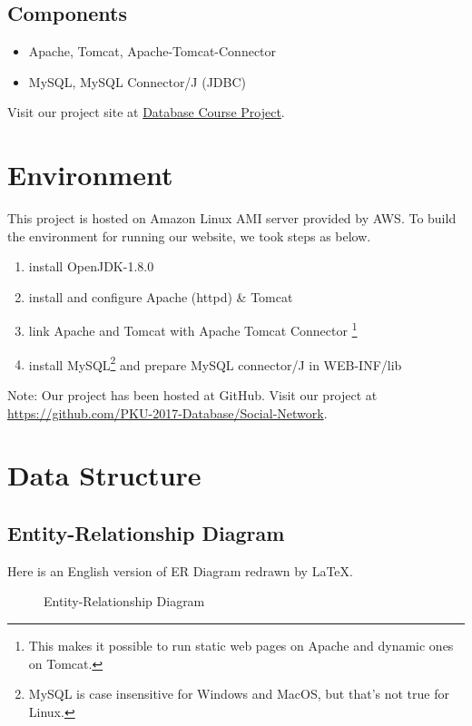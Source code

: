 \subsection{Components}
\begin{itemize}
	\item Apache, Tomcat, Apache-Tomcat-Connector
	\item MySQL, MySQL Connector/J (JDBC)
\end{itemize}

Visit our project site at \href{http://54.250.244.23/database-project/db/main.jsp}{Database Course Project}.

\section{Environment}

This project is hosted on Amazon Linux AMI server provided by AWS. To build the environment for running our website, we took steps as below.

\begin{enumerate}
	\item install OpenJDK-1.8.0
	\item install and configure Apache (httpd) \& Tomcat
	\item link Apache and Tomcat with Apache Tomcat Connector \footnote{This makes it possible to run static web pages on Apache and dynamic ones on Tomcat.}
	\item install MySQL\footnote{MySQL is case insensitive for Windows and MacOS, but that's not true for Linux.} and prepare MySQL connector/J in WEB-INF/lib
\end{enumerate}

Note: Our project has been hosted at GitHub. Visit our project at \url{https://github.com/PKU-2017-Database/Social-Network}.

\section{Data Structure}

\subsection{Entity-Relationship Diagram}

Here is an English version of ER Diagram redrawn by \LaTeX.

\begin{figure}[htbp]
	\begin{center}
		
	\end{center}
	\caption{Entity-Relationship Diagram}
\end{figure}

